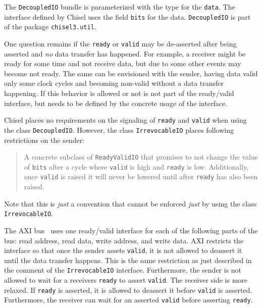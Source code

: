 \documentclass[%
    10pt,
    headinclude, footinclude=false,
    openright, %
    notitlepage,
    cleardoublepage=empty,
    headsepline,
    numbers=noenddot,
    bibliography=totoc, index=totoc,
    ]{scrbook}
\newcommand{\code}[1]{{\lstinline[basicstyle=\small\ttfamily]{#1}}}
\begin{document}

\noindent The \code{DecoupledIO} bundle is parameterized with the type for
the \code{data}. The interface defined by Chisel uses the field \code{bits}
for the data. \code{DecoupledIO} is part of the package \code{chisel3.util}.

One question remains if the \code{ready} or \code{valid} may be de-asserted
after being asserted and \emph{no} data transfer has happened.
For example, a receiver might be ready for some time and not receive data, but
due to some other events may become not ready.
The same can be envisioned with the sender, having data valid only some
clock cycles and becoming non-valid without a data transfer happening.
If this behavior is allowed or not is not part of the ready/valid interface,
but needs to be defined by the concrete usage of the interface.

Chisel places no requirements on the signaling of \code{ready} and \code{valid}
when using the class \code{DecoupledIO}.
However, the class \code{IrrevocableIO} places following restrictions
on the sender:

\begin{quote}
A concrete subclass of \code{ReadyValidIO} that promises to not change
the value of \code{bits} after a cycle where \code{valid} is high and \code{ready} is low.
Additionally, once \code{valid} is raised it will never be lowered until after
\code{ready} has also been raised.
\end{quote}

\noindent Note that this is \emph{just} a convention that cannot be enforced \emph{just}
by using the class \code{IrrevocableIO}.

The AXI  bus~\cite{axi4standard} uses one ready/valid interface for each of the following parts of the bus:
read address, read data, write address, and write data. AXI restricts the interface
so that once the sender assets \code{valid}, it is not allowed to deassert it
until the data transfer happens. This is the same restriction as just described
in the comment of the \code{IrrevocableIO} interface.
Furthermore, the sender is not allowed to wait for a receivers
\code{ready} to assert \code{valid}.
The receiver side is more relaxed. If \code{ready} is asserted, it is allowed to deassert it
before \code{valid} is asserted. Furthermore, the receiver can wait for an asserted
\code{valid} before asserting \code{ready}.

\end{document}
